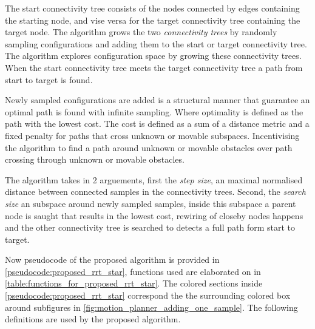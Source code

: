 The start connectivity tree consists of the nodes connected by edges containing the starting node, and vise versa for the target connectivity tree containing the target node. The algorithm grows the two \textit{connectivity trees} by randomly sampling configurations and adding them to the start or target connectivity tree. The algorithm explores configuration space by growing these connectivity trees. When the start connectivity tree meets the target connectivity tree a path from start to target is found.\bs

Newly sampled configurations are added is a structural manner that guarantee an optimal path is found with infinite sampling. Where optimality is defined as the path with the lowest cost. The cost is defined as a sum of a distance metric and a fixed penalty for paths that cross unknown or movable subspaces. Incentivising the algorithm to find a path around unknown or movable obstacles over path crossing through unknown or movable obstacles.\bs

The algorithm takes in 2 arguements, first the \textit{step size}, an maximal normalised distance between connected samples in the connectivity trees. Second, the \textit{search size} an subspace around newly sampled samples, inside this subspace a parent node is saught that results in the lowest cost, rewiring of closeby nodes happens and the other connectivity tree is searched to detects a full path form start to target.\bs

Now pseudocode of the proposed algorithm is provided in \cref{pseudocode:proposed_rrt_star}, functions used are elaborated on in \cref{table:functions_for_proposed_rrt_star}. The colored sections inside \cref{pseudocode:proposed_rrt_star} correspond the the surrounding colored box around subfigures in \cref{fig:motion_planner_adding_one_sample}. The following definitions are used by the proposed algorithm.\bs

